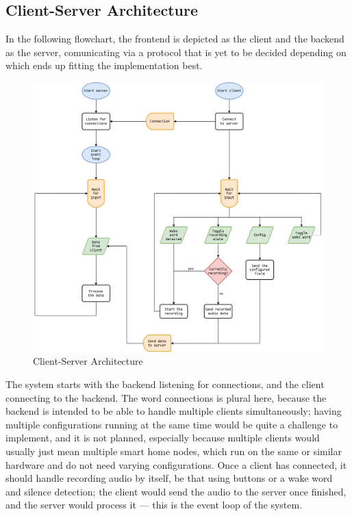 \subsection{Client-Server Architecture}
In the following flowchart, the frontend is depicted as the client and the backend as the server,
comunicating via a protocol that is yet to be decided depending on which ends up fitting the implementation best.

\begin{figure}[H]
\centering
\includegraphics[width=\textwidth]{assets/architecture-pre}
\caption{Client-Server Architecture}
\label{chart:architecture-pre}
\end{figure}

The system starts with the backend listening for connections, and the client connecting to the backend.
The word connections is plural here, because the backend is intended to be able to handle multiple clients simultaneously;
having multiple configurations running at the same time would be quite a challenge to implement, and it is not planned,
especially because multiple clients would usually just mean multiple smart home nodes, which run on the same or similar hardware
and do not need varying configurations.
Once a client has connected, it should handle recording audio by itself, be that using buttons or a wake word and silence detection;
the client would send the audio to the server once finished, and the server would process it --- this is the event loop of the system.

